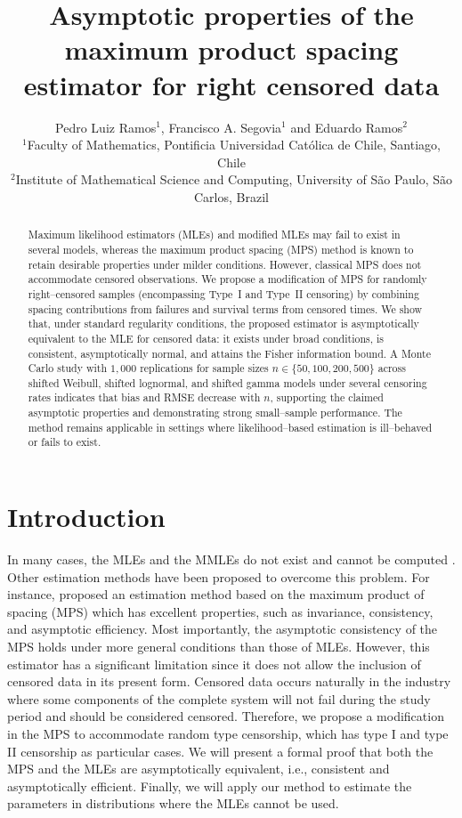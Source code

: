 \documentclass[10pt,a4paper,onecolumn]{article} %
\title{Asymptotic properties of the maximum product spacing estimator for right censored data}
\author{
Pedro Luiz Ramos$^1$, Francisco A. Segovia$^1$ and Eduardo Ramos$^2$\\
\normalsize{$^{1}$Faculty of Mathematics, Pontificia Universidad Católica de Chile, Santiago, Chile}\\
\normalsize{$^{2}$Institute of Mathematical Science and Computing, University of S\~ao Paulo, S\~ao Carlos, Brazil}
}
\begin{document}
\maketitle

\begin{abstract}
Maximum likelihood estimators (MLEs) and modified MLEs may fail to exist in several models, whereas the maximum product spacing (MPS) method is known to retain desirable properties under milder conditions. However, classical MPS does not accommodate censored observations. We propose a modification of MPS for randomly right--censored samples (encompassing Type~I and Type~II censoring) by combining spacing contributions from failures and survival terms from censored times. We show that, under standard regularity conditions, the proposed estimator is asymptotically equivalent to the MLE for censored data: it exists under broad conditions, is consistent, asymptotically normal, and attains the Fisher information bound. A Monte Carlo study with $1{,}000$ replications for sample sizes $n\in\{50,100,200,500\}$ across shifted Weibull, shifted lognormal, and shifted gamma models under several censoring rates indicates that bias and RMSE decrease with $n$, supporting the claimed asymptotic properties and demonstrating strong small--sample performance. The method remains applicable in settings where likelihood--based estimation is ill--behaved or fails to exist.
\end{abstract}

\section{Introduction}

In many cases, the MLEs and the MMLEs do not exist and cannot be computed \citep{cheng1983estimating}. Other estimation methods have been proposed to overcome this problem. For instance, \cite{cheng1983estimating} proposed an estimation method based on the maximum product of spacing (MPS) which has excellent properties, such as invariance, consistency, and asymptotic efficiency. Most importantly, the asymptotic consistency of the MPS holds under more general conditions than those of MLEs. However, this estimator has a significant limitation since it does not allow the inclusion of censored data in its present form. Censored data occurs naturally in the industry where some components of the complete system will not fail during the study period and should be considered censored. Therefore, we propose a modification in the MPS to accommodate random type censorship, which has type I and type II censorship as particular cases. We will present a formal proof that both the MPS and the MLEs are asymptotically equivalent, i.e., consistent and asymptotically efficient. Finally, we will apply our method to estimate the parameters in distributions where the MLEs cannot be used.
\end{document}

